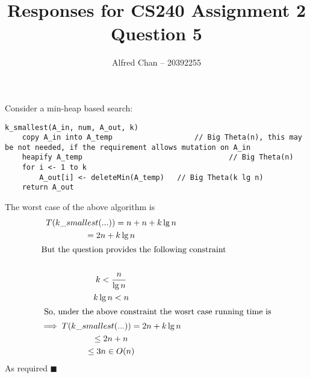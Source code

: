 \documentclass[12pt]{article}
\title{Responses for CS240 Assignment 2 Question 5}
\author{Alfred Chan -- 20392255}
\begin{document}
\maketitle
{}

Consider a min-heap based search:\\

\begin{lstlisting}
k_smallest(A_in, num, A_out, k) 
	copy A_in into A_temp 					// Big Theta(n), this may be not needed, if the requirement allows mutation on A_in
	heapify A_temp 									// Big Theta(n)
	for i <- 1 to k
		A_out[i] <- deleteMin(A_temp)	// Big Theta(k lg n)
	return A_out
\end{lstlisting}
The worst case of the above algorithm is
\begin{gather*}
T(k\_smallest(...)) = n + n + k\lg n\\
= 2n + k\lg n\\
\intertext{But the question provides the following constraint}\\
k < \frac{n}{\lg n}\\
k \lg n < n\\
\intertext{ So, under the above constraint the wosrt case running time is}
\implies T(k\_smallest(...)) = 2n + k\lg n\\
\le 2n + n\\
\le 3n \in O(n)
\end{gather*}
As required
\hfill $\blacksquare$
\end{document}
